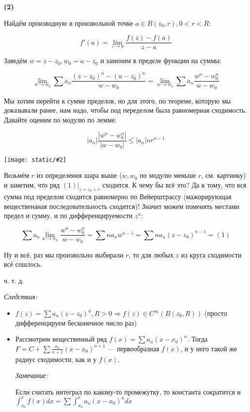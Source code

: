 \documentclass{article}
\def\images#1#2{\begin{center}\texttt{[image: static/\#2]}\end{center}}
\begin{document}
\textbf{(2)}

Найдём производную в произвольной точке $a \in B(z_0, r), 0 < r < R$: 

\[f'(a) = \lim_{z \rightarrow a} \frac{f(z) - f(a)}{z - a}\]

Заведём $w = z - z_0, w_0 = a - z_0$ и заменим в пределе функции на суммы: 

\[\lim_{w \rightarrow w_0} \sum a_n \frac{(z - z_0)^n - (a - z_0)^n}{w - w_0} = \lim_{w \rightarrow w_0} \sum a_n \frac{w^n - w^n_0}{w - w_0}\]

Мы хотим перейти к сумме пределов, но для этого, по теореме, которую мы доказывали ранее, нам надо, чтобы под переделом была равномерная сходимость. Давайте оценим по модулю по лемме: 

\[|a_n|\frac{|w^n - w^n_0|}{|w - w_0|} \le |a_n|nr^{n - 1}\]

\images{0.3}{st_r_diff.png}

Возьмём $r$ из определения шара выше ($w, w_0$ по модулю меньше $r$, см. картинку) и заметим, что ряд $(1)|_{z = z_0 + r}$ сходится. К чему бы всё это? Да к тому, что вся сумма под пределом сходится равномерно по Вейерштрассу (мажорирующая вещественаная последовательность сходится)! Значит можем поменять местами предел и сумму, и по дифференцируемости $z^n$:

\[\sum a_n \lim_{w \rightarrow w_0} \frac{w^n - w^n_0}{w - w_0} = \sum n a_n w^{n - 1} = \sum n a_n (z - z_0)^{n - 1} = (1)\]

Ну и всё, раз мы произвольно выбирали $r$, то для любых $z$ из круга сходимости всё сошлось.

ч. т. д.

\textit{Следствия:}

\begin{itemize}
    \item $f(z) = \sum a_n(z - z_0)^n, R > 0 \Rightarrow f(z) \in C^{\infty}(B(z_0, R))$ (просто дифференцируем бесконечное число раз)
    \item Рассмотрим вещественный ряд $f(x) = \sum a_n (x - x_0)^n$. Тогда  $F = C + \sum \frac{a_n}{n + 1}(x - x_0)^{n + 1}$ --- первообразная $f(x)$, и у него такой же радиус сходимости, как и у $f(x)$.
    
    \textit{Замечание:}

    Если считать интеграл по какому-то промежутку, то константа сократится и $\int_{x_0}^{x} f(x) dx = \sum \int_{x_0}^{x}a_n(x - x_0)^n dx$
\end{itemize}
\end{document}

